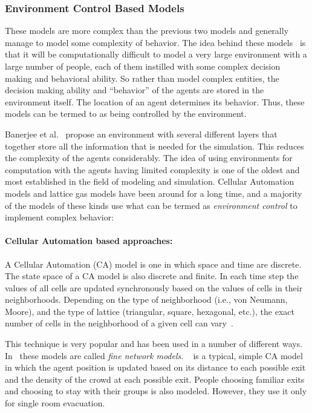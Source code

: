 \subsubsection{Environment Control Based Models}
\label{sec:EnvironmentControlBasedModels}

These models are more complex than the previous two models and generally manage to model some complexity of behavior. The idea behind these models~\cite{Banerjee:2008jh} is that it will be computationally difficult to model a very large environment with a large number of people, each of them instilled with some complex decision making and behavioral ability. So rather than model complex entities, the decision making ability and ``behavior'' of the agents are stored in the environment itself. The location of an agent determines its behavior. Thus, these models can be termed to as being controlled by the environment.

Banerjee et al.~\cite{Banerjee:2008jh,Banerjee:2009jo} propose an environment with several different layers that together store all the information that is needed for the simulation. This reduces the complexity of the agents considerably. The idea of using environments for computation with the agents having limited complexity is one of the oldest and most established in the field of modeling and simulation. Cellular Automation models and lattice gas models have been around for a long time, and a majority of the models of these kinds use what can be termed as \emph{environment control} to implement complex behavior:

\paragraph{Cellular Automation based approaches:}

 A Cellular Automation (CA) model is one in which space and time are discrete. The state space of a CA model is also discrete and finite. In each time step the values of all cells are updated synchronously based on the values of cells in their neighborhoods. Depending on the type of neighborhood (i.e., von Neumann, Moore), and the type of lattice (triangular, square, hexagonal, etc.), the exact number of cells in the neighborhood of a given cell can vary~\cite{Hoekstra:2010}.

 This technique is very popular and has been used in a number of different ways. In~\cite{Gwynne:1999vi,Kuligowski:2005tt} these models are called \emph{fine network models}.
~\cite{Yuan:2007ja} is a typical, simple CA model in which the agent position is updated based on its distance to each possible exit and the density of the crowd at each possible exit. People choosing familiar exits and choosing to stay with their groups is also modeled. However, they use it only for single room evacuation.

